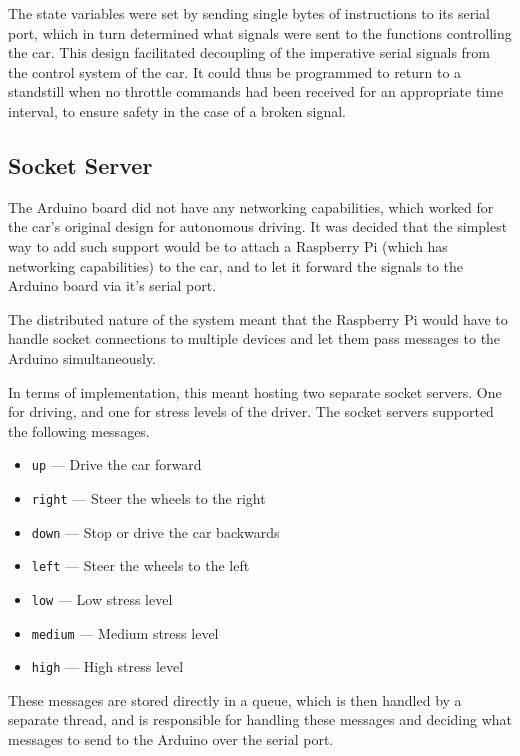 The state variables were set by sending single bytes of instructions to its
serial port, which in turn determined what signals were sent to the functions
controlling the car.  This design facilitated decoupling of the imperative
serial signals from the control system of the car. It could thus be programmed
to return to a standstill when no throttle commands had been received for
an appropriate time interval, to ensure safety in the case of a broken signal.

\subsection{Socket Server}\label{sec:design_socket_server}

The Arduino board did not have any networking capabilities, which worked for
the car's original design for autonomous driving. It was decided that the
simplest way to add such support would be to attach a Raspberry Pi (which
has networking capabilities) to the car, and to let it forward the signals
to the Arduino board via it's serial port.

The distributed nature of the system meant that the Raspberry Pi would have
to handle socket connections to multiple devices and let them pass messages
to the Arduino simultaneously.

In terms of implementation, this meant hosting two separate socket servers.
One for driving, and one for stress levels of the driver. The socket servers
supported the following messages.

\begin{itemize}
  \item \texttt{up} --- Drive the car forward
  \item \texttt{right} --- Steer the wheels to the right
  \item \texttt{down} --- Stop or drive the car backwards
  \item \texttt{left} --- Steer the wheels to the left
  \item \texttt{low} --- Low stress level
  \item \texttt{medium} --- Medium stress level
  \item \texttt{high} --- High stress level
\end{itemize}

These messages are stored directly in a queue, which is then handled by a
separate thread, and is responsible for handling these messages and deciding
what messages to send to the Arduino over the serial port.


